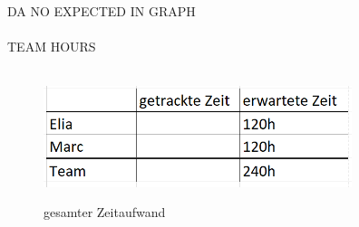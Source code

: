 DA NO EXPECTED IN GRAPH\\
\\
TEAM HOURS\\
\\

\begin{figure}[H]
    \centering
    \includegraphics[width=9cm]{resources/tracket_time_temp.png}\\
    \caption{gesamter Zeitaufwand}
\end{figure}




